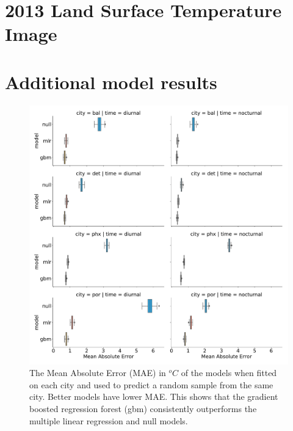 \documentclass[]{elsarticle}
\begin{document}




% 

\appendix
\section{2013 Land Surface Temperature Image}


\section{Additional model results}
\begin{figure}[h]
\begin{center}
\includegraphics[width=\textwidth]{fig/report/holdout_results_mae.pdf}
\caption{The Mean Absolute Error (MAE) in $^oC$ of the models when fitted on each city and used to predict a random sample from the same city. Better models have lower MAE. This shows that the gradient boosted regression forest (gbm) consistently outperforms the multiple linear regression and null models. }
\label{fig:cityholdout_errors}
\end{center}
\end{figure}
\end{document}
